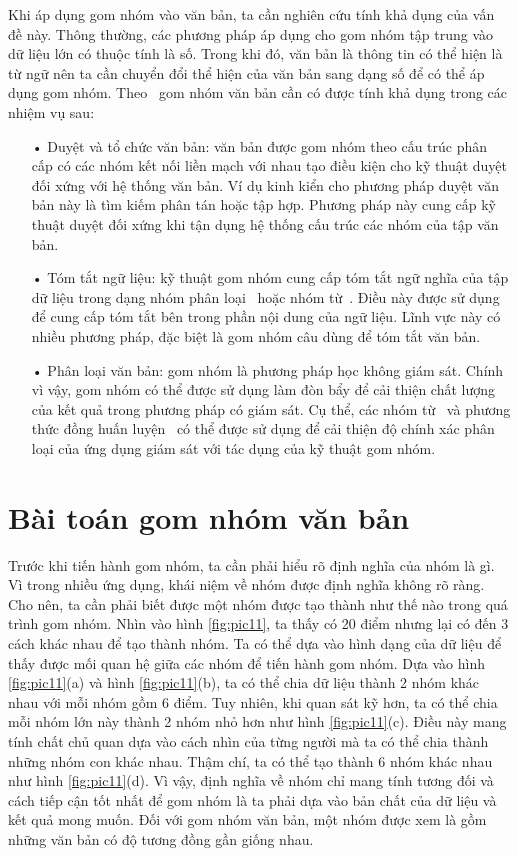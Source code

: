 Khi áp dụng gom nhóm vào văn bản, ta cần nghiên cứu tính khả dụng của vấn đề này.
Thông thường, các phương pháp áp dụng cho gom nhóm tập trung vào dữ liệu lớn có thuộc tính là số.
Trong khi đó, văn bản là thông tin có thể hiện là từ ngữ nên ta cần chuyển đổi thể hiện của văn bản sang dạng số để có thể áp dụng gom nhóm.
Theo~\cite{text-cluster} gom nhóm văn bản cần có được tính khả dụng trong các nhiệm vụ sau:
\begin{enumerate}
\item[•]Duyệt và tổ chức văn bản: văn bản được gom nhóm theo cấu trúc phân cấp có các nhóm kết nối liền mạch với nhau tạo điều kiện cho kỹ thuật duyệt đối xứng với hệ thống văn bản.
Ví dụ kinh kiển cho phương pháp duyệt văn bản này là tìm kiếm phân tán hoặc tập hợp.
Phương pháp này cung cấp kỹ thuật duyệt đối xứng khi tận dụng hệ thống cấu trúc các nhóm của tập văn bản.
\item[•]Tóm tắt ngữ liệu: kỹ thuật gom nhóm cung cấp tóm tắt ngữ nghĩa của tập dữ liệu trong dạng nhóm phân loại~\cite{cluster-digest} hoặc nhóm từ~\cite{cluster-word-1,cluster-word-2}.
Điều này được sử dụng để cung cấp tóm tắt bên trong phần nội dung của ngữ liệu.
Lĩnh vực này có nhiều phương pháp, đặc biệt là gom nhóm câu dùng để tóm tắt văn bản.
\item[•]Phân loại văn bản: gom nhóm là phương pháp học không giám sát.
Chính vì vậy, gom nhóm có thể được sử dụng làm đòn bẩy để cải thiện chất lượng của kết quả trong phương pháp có giám sát.
Cụ thể, các nhóm từ~\cite{cluster-word-1, cluster-word-2} và phương thức đồng huấn luyện~\cite{cluster-word-3} có thể được sử dụng để cải thiện độ chính xác phân loại của ứng dụng giám sát với tác dụng của kỹ thuật gom nhóm.
\end{enumerate}

\section{Bài toán gom nhóm văn bản}
Trước khi tiến hành gom nhóm, ta cần phải hiểu rõ định nghĩa của nhóm là gì.
Vì trong nhiều ứng dụng, khái niệm về nhóm được định nghĩa không rõ ràng.
Cho nên, ta cần phải biết được một nhóm được tạo thành như thế nào trong quá trình gom nhóm.
Nhìn vào hình \ref{fig:pic11}, ta thấy có 20 điểm nhưng lại có đến 3 cách khác nhau để tạo thành nhóm.
Ta có thể dựa vào hình dạng của dữ liệu để thấy được mối quan hệ giữa các nhóm để tiến hành gom nhóm.
Dựa vào hình \ref{fig:pic11}(a) và hình \ref{fig:pic11}(b), ta có thể chia dữ liệu thành 2 nhóm khác nhau với mỗi nhóm gồm 6 điểm.
Tuy nhiên, khi quan sát kỹ hơn, ta có thể chia mỗi nhóm lớn này thành 2 nhóm nhỏ hơn như hình \ref{fig:pic11}(c).
Điều này mang tính chất chủ quan dựa vào cách nhìn của từng người mà ta có thể chia thành những nhóm con khác nhau.
Thậm chí, ta có thể tạo thành 6 nhóm khác nhau như hình \ref{fig:pic11}(d).
Vì vậy, định nghĩa về nhóm chỉ mang tính tương đối và cách tiếp cận tốt nhất để gom nhóm là ta phải dựa vào bản chất của dữ liệu và kết quả mong muốn.
Đối với gom nhóm văn bản, một nhóm được xem là gồm những văn bản có độ tương đồng gần giống nhau.

